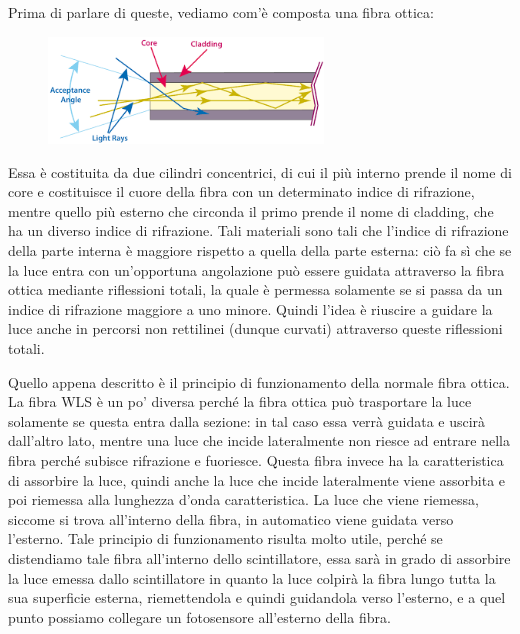 Prima di parlare di queste, vediamo com'è composta una fibra ottica:
\begin{figure}[H]
   \centering
   \includegraphics[width=0.65\textwidth]{immagini/struttura_fibra_ottica.png}
\end{figure}
Essa è costituita da due cilindri concentrici, di cui il più interno prende il nome di core e costituisce il cuore della fibra con un determinato indice di rifrazione, mentre quello più esterno che circonda il primo prende il nome di cladding, che ha un diverso indice di rifrazione. Tali materiali sono tali che l'indice di rifrazione della parte interna è maggiore rispetto a quella della parte esterna: ciò fa sì che se la luce entra con un'opportuna angolazione può essere guidata attraverso la fibra ottica mediante riflessioni totali, la quale è permessa solamente se si passa da un indice di rifrazione maggiore a uno minore. Quindi l'idea è riuscire a guidare la luce anche in percorsi non rettilinei (dunque curvati) attraverso queste riflessioni totali.

Quello appena descritto è il principio di funzionamento della normale fibra ottica. La fibra WLS è un po' diversa perché la fibra ottica può trasportare la luce solamente se questa entra dalla sezione: in tal caso essa verrà guidata e uscirà dall'altro lato, mentre una luce che incide lateralmente non riesce ad entrare nella fibra perché subisce rifrazione e fuoriesce. Questa fibra invece ha la caratteristica di assorbire la luce, quindi anche la luce che incide lateralmente viene assorbita e poi riemessa alla lunghezza d'onda caratteristica. La luce che viene riemessa, siccome si trova all'interno della fibra, in automatico viene guidata verso l'esterno. Tale principio di funzionamento risulta molto utile, perché se distendiamo tale fibra all'interno dello scintillatore, essa sarà in grado di assorbire la luce emessa dallo scintillatore in quanto la luce colpirà la fibra lungo tutta la sua superficie esterna, riemettendola e quindi guidandola verso l'esterno, e a quel punto possiamo collegare un fotosensore all'esterno della fibra.

